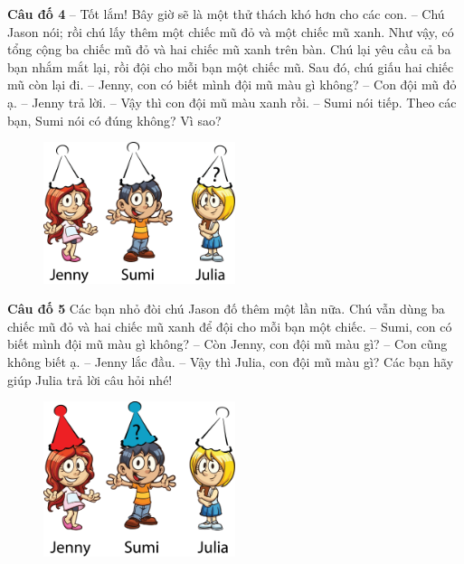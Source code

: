 	\textbf{Câu đố 4}
	\vskip 0.1cm
	-- Tốt lắm! Bây giờ sẽ là một thử thách khó hơn cho các con. -- Chú Jason nói; rồi chú lấy thêm một chiếc mũ đỏ và một chiếc mũ xanh. Như vậy, có tổng cộng ba chiếc mũ đỏ và hai chiếc mũ xanh trên bàn. Chú lại yêu cầu cả ba bạn nhắm mắt lại, rồi đội cho mỗi bạn một chiếc mũ. Sau đó, chú giấu hai chiếc mũ còn lại đi.
	\vskip 0.1cm
	-- Jenny, con có biết mình đội mũ màu gì không?
	\vskip 0.1cm
	-- Con đội mũ đỏ ạ. -- Jenny trả lời.
	\vskip 0.1cm
	-- Vậy thì con đội mũ màu xanh rồi. -- Sumi  nói tiếp.
	\vskip 0.1cm
	Theo các bạn, Sumi nói có đúng không? Vì sao?
	\begin{figure}[H]
		\centering
		\vspace*{-5pt}
		\captionsetup{labelformat= empty, justification=centering}
		\includegraphics[width=0.5\textwidth]{h5}
		\vspace*{-10pt}
	\end{figure}
	
	\textbf{Câu đố 5}
	\vskip 0.1cm
	Các bạn nhỏ đòi chú Jason đố thêm một lần nữa. Chú vẫn dùng ba chiếc mũ đỏ và hai chiếc mũ xanh để đội cho mỗi bạn một chiếc.
	\vskip 0.1cm
	-- Sumi, con có biết mình đội mũ màu gì không?
	\vskip 0.1cm
	-- Còn Jenny, con đội mũ màu gì?
	\vskip 0.1cm
	-- Con cũng không biết ạ. -- Jenny lắc đầu.
	\vskip 0.1cm
	-- Vậy thì Julia, con đội mũ màu gì?
	\vskip 0.1cm
	Các bạn hãy giúp Julia trả lời câu hỏi nhé!
	\begin{figure}[H]
		\centering
		\vspace*{-5pt}
		\captionsetup{labelformat= empty, justification=centering}
		\includegraphics[width=0.5\textwidth]{h4}
		\vspace*{-10pt}
	\end{figure}